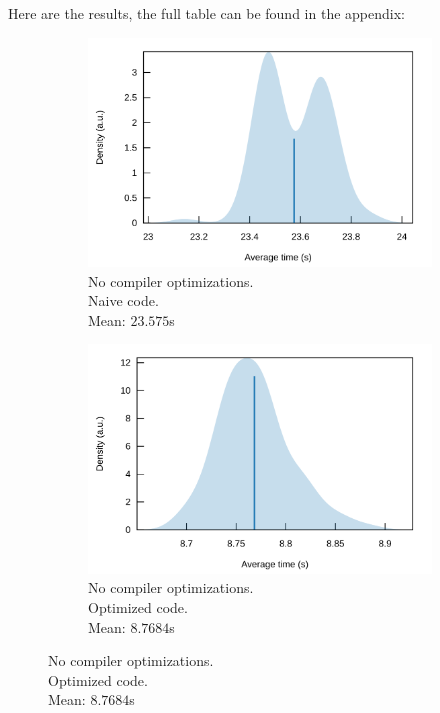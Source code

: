 Here are the results, the full table can be found in the appendix:

\begin{figure}[H]
\centering
\begin{subfigure}{.33\textwidth}
  \centering
  \includegraphics[width=\linewidth]{./assets/nocompiler_unoptimized}
  \caption{No compiler optimizations.\\\hspace*{0.6cm}Naive code.\\\hspace*{0.6cm}Mean: $23.575$s}
\end{subfigure}%
\begin{subfigure}{.33\textwidth}
  \centering
  \includegraphics[width=\linewidth]{./assets/nocompiler_optimized.png}
  \caption{No compiler optimizations.\\\hspace*{0.6cm}Optimized code.\\\hspace*{0.6cm}Mean: $8.7684$s}

\end{subfigure}
\end{figure}
